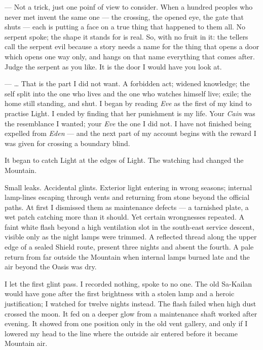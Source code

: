 \begin{room}
--- Not a trick, just one poinf of view to consider. When a hundred peoples who never met invent the same one --- the crossing, the opened eye, the gate that shuts --- each is putting a face on a true thing that happened to them all. No serpent spoke; the shape it stands for is real. So, with no fruit in it: the tellers call the serpent evil because a story needs a name for the thing that opens a door which opens one way only, and hangs on that name everything that comes after. Judge the serpent as you like. It is the door I would have you look at.

--- \ldots{} That is the part I did not want. A forbidden act; widened knowledge; the self split into the one who lives and the one who watches himself live; exile; the home still standing, and shut. I began by reading \textit{Eve} as the first of my kind to practise Light. I ended by finding that her punishment is my life. Your \textit{Cain} was the resemblance I wanted; your \textit{Eve} the one I did not. I have not finished being expelled from \textit{Eden} --- and the next part of my account begins with the reward I was given for crossing a boundary blind.

\end{room}
It began to catch Light at the edges of Light. The watching had changed the Mountain.\par

Small leaks. Accidental glints. Exterior light entering in wrong seasons; internal lamp-lines escaping through vents and returning from stone beyond the official paths. At first I dismissed them as maintenance defects --- a tarnished plate, a wet patch catching more than it should. Yet certain wrongnesses repeated. A faint white flash beyond a high ventilation slot in the south-east service descent, visible only as the night lamps were trimmed. A reflected thread along the upper edge of a sealed Shield route, present three nights and absent the fourth. A pale return from far outside the Mountain when internal lamps burned late and the air beyond the Oasis was dry.\par

I let the first glint pass. I recorded nothing, spoke to no one. The old Sa-Kailan would have gone after the first brightness with a stolen lamp and a heroic justification; I watched for twelve nights instead. The flash failed when high dust crossed the moon. It fed on a deeper glow from a maintenance shaft worked after evening. It showed from one position only in the old vent gallery, and only if I lowered my head to the line where the outside air entered before it became Mountain air.\par

